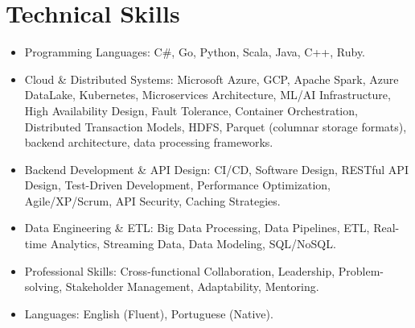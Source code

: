 
\section{Technical Skills}

\begin{itemize}
    \item \footnotesize{Programming Languages:}\scriptsize{ C\#, Go, Python, Scala, Java, C++, Ruby.}

    \item \footnotesize{Cloud \& Distributed Systems:}\scriptsize{ Microsoft Azure, GCP, Apache Spark, Azure DataLake, Kubernetes, Microservices Architecture, ML/AI Infrastructure, High Availability Design, Fault Tolerance, Container Orchestration, Distributed Transaction Models, HDFS, Parquet (columnar storage formats), backend architecture, data processing frameworks.}
    
    \item \footnotesize{Backend Development \& API Design:}\scriptsize{ CI/CD, Software Design, RESTful API Design, Test-Driven Development, Performance Optimization, Agile/XP/Scrum, API Security, Caching Strategies.}
    
    \item \footnotesize{Data Engineering \& ETL:}\scriptsize{ Big Data Processing, Data Pipelines, ETL, Real-time Analytics, Streaming Data, Data Modeling, SQL/NoSQL.}
    
    \item \footnotesize{Professional Skills:}\scriptsize{ Cross-functional Collaboration, Leadership, Problem-solving, Stakeholder Management, Adaptability, Mentoring.}
    
    \item \footnotesize{Languages:}\scriptsize{ English (Fluent), Portuguese (Native).}
\end{itemize}